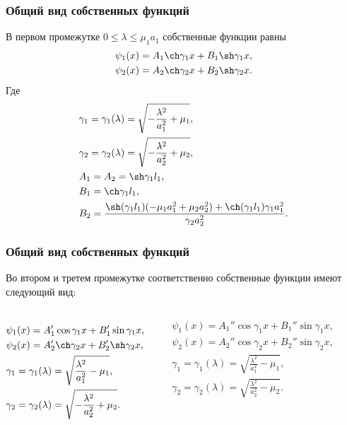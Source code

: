 \documentclass[10pt,pdf,hyperref={unicode}]{beamer}
\begin{document}
\begin{frame}
  \frametitle{Общий вид собственных функций}
    В первом промежутке $ 0 \le \lambda \le \mu_1a_1$ собственные функции равны
    \begin{equation*}
      \begin{aligned}
        \psi_1(x) = A_1 \ch \gamma_1x + B_1 \sh \gamma_1x, \\
        \psi_2(x) = A_2 \ch \gamma_2x + B_2 \sh \gamma_2x.
      \end{aligned}
    \end{equation*}
    Где
    \begin{equation*}
      \begin{aligned}
        & \gamma_1 = \gamma_1(\lambda) = \sqrt{- \frac{\lambda^2}{a_1^2} + \mu_1}, \\
        & \gamma_2 = \gamma_2(\lambda) = \sqrt{- \frac{\lambda^2}{a_2^2} + \mu_2}, \\
        & A_1 = A_2 = \sh \gamma_1l_1, \\
        & B_1 = \ch \gamma_1l_1, \\
        & B_2 = \frac{\sh (\gamma_1l_1) (-\mu_1 a_1^2 + \mu_2 a_2^2) + \ch (\gamma_1l_1) \gamma_1 a_1^2}{\gamma_2a_2^2}.
      \end{aligned}
    \end{equation*}
\end{frame}

\begin{frame}
  \frametitle{Общий вид собственных функций}
  Во втором и третем промежутке соответственно собственные функции имеют следующий вид:
  \begin{columns}
      \begin{equation*}
        \begin{aligned}
          & \psi_1(x) = A_1' \cos \gamma_1x + B_1' \sin \gamma_1x, \\
          & \psi_2(x) = A_2' \ch \gamma_2x + B_2' \sh \gamma_2x, \\
          & \gamma_1 = \gamma_1(\lambda) = \sqrt{\frac{\lambda^2}{a_1^2} - \mu_1}, \\
          & \gamma_2 = \gamma_2(\lambda) = \sqrt{- \frac{\lambda^2}{a_2^2} + \mu_2}.
        \end{aligned}
      \end{equation*}


      \begin{equation*}
        \begin{aligned}
          & \psi_1(x) = A_1'' \cos \gamma_1x + B_1'' \sin \gamma_1x, \\
          & \psi_2(x) = A_2'' \cos \gamma_2x + B_2'' \sin \gamma_2x, \\
          & \gamma_1 = \gamma_1(\lambda) = \sqrt{\frac{\lambda^2}{a_1^2} - \mu_1}, \\
          & \gamma_2 = \gamma_2(\lambda) = \sqrt{\frac{\lambda^2}{a_2^2} - \mu_2}.
        \end{aligned}
      \end{equation*}
  \end{columns}
\end{frame}
\end{document}
